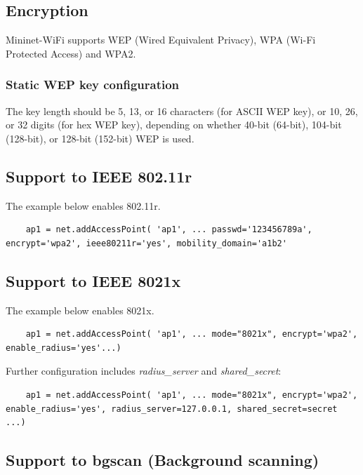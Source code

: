 \subsection{Encryption}
Mininet-WiFi supports WEP (Wired Equivalent Privacy), WPA (Wi-Fi Protected Access) and WPA2.

\subsubsection{Static WEP key configuration}
The key length should be 5, 13, or 16 characters (for ASCII WEP key), or 10, 26, or 32 digits (for hex WEP key), depending on whether 40-bit (64-bit), 104-bit (128-bit), or 128-bit (152-bit) WEP is used.

\subsection{Support to IEEE 802.11r}

The example below enables 802.11r.

\begin{verbatim}
    ap1 = net.addAccessPoint( 'ap1', ... passwd='123456789a', encrypt='wpa2', ieee80211r='yes', mobility_domain='a1b2'
\end{verbatim}

\subsection{Support to IEEE 8021x}

The example below enables 8021x.

\begin{verbatim}
    ap1 = net.addAccessPoint( 'ap1', ... mode="8021x", encrypt='wpa2', enable_radius='yes'...)
\end{verbatim}

\noindent Further configuration includes \textit{radius\_server} and \textit{shared\_secret}:

\begin{verbatim}
    ap1 = net.addAccessPoint( 'ap1', ... mode="8021x", encrypt='wpa2', enable_radius='yes', radius_server=127.0.0.1, shared_secret=secret ...)
\end{verbatim}

\subsection{Support to bgscan (Background scanning)}


